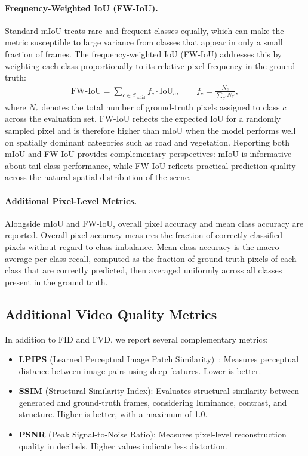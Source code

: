 \paragraph{Frequency-Weighted IoU (FW-IoU).}
Standard mIoU treats rare and frequent classes equally, which can make the metric susceptible to large variance from classes that appear in only a small fraction of frames. The frequency-weighted IoU (FW-IoU) addresses this by weighting each class proportionally to its relative pixel frequency in the ground truth:
\begin{align}
    \text{FW-IoU} = \sum_{c \in \mathcal{C}_{\text{valid}}} f_c \cdot \text{IoU}_c, \qquad f_c = \frac{N_c}{\sum_{c'} N_{c'}},
    \label{eq:fwiou}
\end{align}
where $N_c$ denotes the total number of ground-truth pixels assigned to class $c$ across the evaluation set. FW-IoU reflects the expected IoU for a randomly sampled pixel and is therefore higher than mIoU when the model performs well on spatially dominant categories such as road and vegetation. Reporting both mIoU and FW-IoU provides complementary perspectives: mIoU is informative about tail-class performance, while FW-IoU reflects practical prediction quality across the natural spatial distribution of the scene.

\paragraph{Additional Pixel-Level Metrics.}
Alongside mIoU and FW-IoU, overall pixel accuracy and mean class accuracy are reported. Overall pixel accuracy measures the fraction of correctly classified pixels without regard to class imbalance. Mean class accuracy is the macro-average per-class recall, computed as the fraction of ground-truth pixels of each class that are correctly predicted, then averaged uniformly across all classes present in the ground truth.

\subsection{Additional Video Quality Metrics}
\label{subsec:additional_metrics}

In addition to FID and FVD, we report several complementary metrics:

\begin{itemize}
    \item \textbf{LPIPS} (Learned Perceptual Image Patch Similarity)~\cite{zhang2018unreasonable}: Measures perceptual distance between image pairs using deep features. Lower is better.
    \item \textbf{SSIM} (Structural Similarity Index): Evaluates structural similarity between generated and ground-truth frames, considering luminance, contrast, and structure. Higher is better, with a maximum of 1.0.
    \item \textbf{PSNR} (Peak Signal-to-Noise Ratio): Measures pixel-level reconstruction quality in decibels. Higher values indicate less distortion.
\end{itemize}

